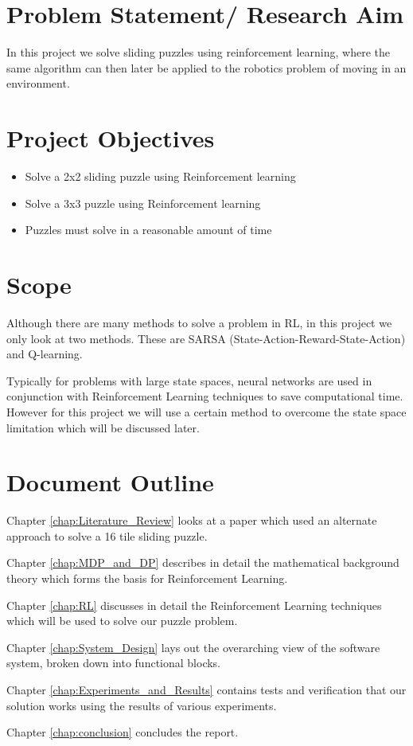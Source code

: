 \section{Problem Statement/ Research Aim}
In this project
we solve sliding puzzles using
reinforcement learning, where the same algorithm can then later be applied to the robotics problem of moving in an environment.

\section{Project Objectives}
\begin{itemize}
	\item Solve a 2x2 sliding puzzle using Reinforcement learning
	\item Solve a 3x3 puzzle using Reinforcement learning
	\item Puzzles must solve in a reasonable amount of time
\end{itemize}

\section{Scope}
Although there are many methods to solve a problem in RL, in this project we only look at two methods. These are SARSA (State-Action-Reward-State-Action) and Q-learning. 

Typically for problems with large state spaces, neural networks are used in conjunction with Reinforcement Learning techniques to save computational time. However for this project we will use a certain method to overcome the state space limitation which will be discussed later.

\section{Document Outline} 
Chapter \ref{chap:Literature_Review} looks at a paper which used an alternate approach to solve a 16 tile sliding puzzle.

Chapter \ref{chap:MDP_and_DP} describes in detail the mathematical background theory which forms the basis for Reinforcement Learning.

Chapter \ref{chap:RL} discusses in detail the Reinforcement Learning techniques which will be used to solve our puzzle problem.

Chapter \ref{chap:System_Design} lays out the overarching view of the software system, broken down into functional blocks.

Chapter \ref{chap:Experiments_and_Results} contains tests and verification that our solution works using the results of various experiments.

Chapter \ref{chap:conclusion} concludes the report.
